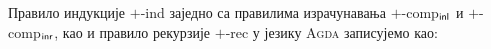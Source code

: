 Правило индукције $+$-ind заједно са правилима израчунавања $+$-comp$_{\mathsf{inl}}$ и $+$-comp$_{\mathsf{inr}}$, као и правило рекурзије $+$-rec у језику \textsc{Agda} записујемо као:
\begin{code}%
\>[0]%
\>[396I]\AgdaSymbol{:}\AgdaSpace{}%
\AgdaSymbol{\{}\AgdaSpace{}%
\AgdaSymbol{:}\AgdaSpace{}%
\AgdaSpace{}%
\AgdaSpace{}%
\AgdaSymbol{\}}\AgdaSpace{}%
\AgdaSymbol{\{}\AgdaSpace{}%
\AgdaSymbol{:}\AgdaSpace{}%
\AgdaSpace{}%
\AgdaSpace{}%
\AgdaSymbol{\}}\AgdaSpace{}%
\AgdaSymbol{(}\AgdaSpace{}%
\AgdaSymbol{:}\AgdaSpace{}%
\AgdaSpace{}%
\AgdaOperator{\AgdaDatatype{+}}\AgdaSpace{}%
\AgdaSpace{}%
\AgdaSpace{}%
\AgdaSpace{}%
\AgdaSpace{}%
\AgdaSymbol{)}\<%
\\
\>[.][@{}l@{}]\<[396I]%
\>[12]\AgdaSpace{}%
\AgdaSymbol{((}\AgdaSpace{}%
\AgdaSymbol{:}\AgdaSpace{}%
\AgdaSymbol{)}\AgdaSpace{}%
\AgdaSpace{}%
\AgdaSpace{}%
\AgdaSymbol{(}\AgdaSpace{}%
\AgdaSymbol{))}\<%
\\
%
\>[12]\AgdaSpace{}%
\AgdaSymbol{((}\AgdaSpace{}%
\AgdaSymbol{:}\AgdaSpace{}%
\AgdaSymbol{)}\AgdaSpace{}%
\AgdaSpace{}%
\AgdaSpace{}%
\AgdaSymbol{(}\AgdaSpace{}%
\AgdaSymbol{))}\<%
\\
%
\>[12]\AgdaSpace{}%
\AgdaSymbol{(}\AgdaSpace{}%
\AgdaSymbol{:}\AgdaSpace{}%
\AgdaSpace{}%
\AgdaOperator{\AgdaDatatype{+}}\AgdaSpace{}%
\AgdaSymbol{)}\AgdaSpace{}%
\AgdaSpace{}%
\AgdaSpace{}%
\<%
\\
\>[0]\AgdaSpace{}%
\AgdaSpace{}%
\AgdaSpace{}%
\AgdaSpace{}%
\AgdaSymbol{(}\AgdaSpace{}%
\AgdaSymbol{)}\AgdaSpace{}%
\AgdaSymbol{=}\AgdaSpace{}%
\AgdaSpace{}%
\<%
\\
\>[0]\AgdaSpace{}%
\AgdaSpace{}%
\AgdaSpace{}%
\AgdaSpace{}%
\AgdaSymbol{(}\AgdaSpace{}%
\AgdaSymbol{)}\AgdaSpace{}%
\AgdaSymbol{=}\AgdaSpace{}%

\end{code}
